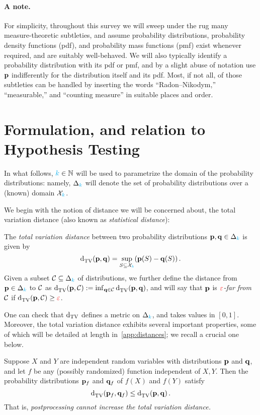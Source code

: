 \paragraph{A note.} For simplicity, throughout this survey we will sweep under the rug many measure-theoretic subtleties, and assume probability distributions, probability density functions (pdf), and probability mass functions (pmf) exist whenever required, and are suitably well-behaved. We will also typically identify a probability distribution with its pdf or pmf, and by a slight abuse of notation use $\mathbf{p}$ indifferently for the distribution itself and its pdf. Most, if not all, of those subtleties can be handled by inserting the words ``Radon--Nikodym,'' ``measurable,'' and ``counting measure'' in suitable places and order.

\section{Formulation, and relation to Hypothesis Testing}


In what follows, ${\textcolor{cyan}{k}}\in\mathbb{N}$ will be used to parametrize the domain of the probability distributions: namely, $\Delta_{{\textcolor{cyan}{k}}}$ will denote the set of probability distributions over a (known) domain $\mathcal{X}_{\textcolor{cyan}{k}}$.

We begin with the notion of distance we will be concerned about, the total variation distance (also known as \emph{statistical distance}):
\begin{definition}
  \label{def:tv}
  The \emph{total variation distance} between two probability distributions $\mathbf{p},\mathbf{q}\in\Delta_{{\textcolor{cyan}{k}}}$ is given by
  \[
    \totalvardist{\p}{\q} = \sup_{S\subseteq \domain_\ab} (\p(S)-\q(S))\,.
  \]
  Given a subset $\mathcal{C}\subseteq\Delta_{{\textcolor{cyan}{k}}}$ of distributions, we further define the distance from $\mathbf{p}\in\Delta_{{\textcolor{cyan}{k}}}$ to $\mathcal{C}$ as $\totalvardist{\p}{\class} \eqdef \inf_{\q\in\class} \totalvardist{\p}{\q}$, and will say that $\mathbf{p}$ is \emph{$\textcolor{red}{\varepsilon}$-far from $\mathcal{C}$} if $\totalvardist{\p}{\class}\geq \dst$.
\end{definition}
One can check that $\operatorname{d}_{\rm TV}$ defines a metric on $\Delta_{{\textcolor{cyan}{k}}}$, and takes values in $[0,1]$. Moreover, the total variation distance exhibits several important properties, some of which will be detailed at length in~\cref{app:distances}; we recall a crucial one below.

\begin{fact}
  \label{fact:dpi}
  Suppose $X$ and $Y$ are independent random variables with distributions $\mathbf{p}$ and $\mathbf{q}$, and let $f$ be any (possibly randomized) function independent of $X,Y$. Then the probability distributions $\mathbf{p}_f$ and $\mathbf{q}_f$ of $f(X)$ and $f(Y)$ satisfy
  \[
      \totalvardist{\p_f}{\q_f} \leq \totalvardist{\p}{\q}\,.
  \]
  That is, \emph{postprocessing cannot increase the total variation distance.}
\end{fact}


